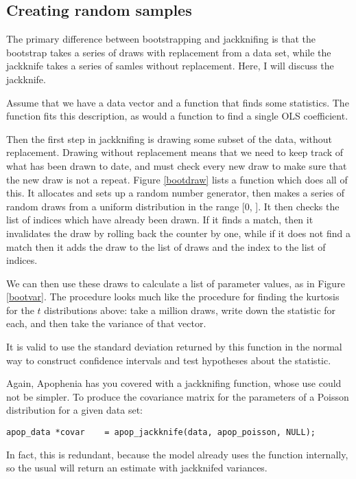 \subsection{Creating random samples} 
The primary difference between bootstrapping and jackknifing is that
the bootstrap takes a series of draws with replacement from a data set,
while the jackknife takes a series of samles without replacement. Here,
I will discuss the jackknife.

Assume that we have a
data vector  and a function  that finds some statistics. The
function  fits this description, as would a function to find
a single OLS coefficient.


Then the first step in jackknifing is drawing some subset of the data,
without replacement. Drawing without replacement means that we need to
keep track of what has been drawn to date, and must check every new draw
to make sure that the new draw is not a repeat. Figure \ref{bootdraw} lists a function which
does all of this. It allocates and sets up a random number generator, then
makes a series of random draws from a uniform distribution in the range
[0, ]. It then checks the list of indices which have
already been drawn. If it finds a match, then it invalidates the draw
by rolling back the counter by one, while if it does not find a match then it
adds the draw to the list of draws and the index to the list of indices.

 We can then use these draws to calculate a
list of parameter values, as in Figure \ref{bootvar}. The procedure
looks much like the procedure for finding the kurtosis for the $t$
distributions above: take a million draws, write down the statistic for
each, and then take the variance of that vector.

It is valid to use the standard deviation returned by this function 
in the normal way to construct confidence intervals and test
hypotheses about the statistic.

Again, Apophenia has you covered with a jackknifing function, whose
use could not be simpler. To produce the covariance matrix for the
parameters of a Poisson distribution for a given data set:
\begin{lstlisting}
apop_data *covar    = apop_jackknife(data, apop_poisson, NULL);
\end{lstlisting}
In fact, this is redundant, because the 
model already uses the  function internally,
so the usual 
will return an estimate with jackknifed variances.

